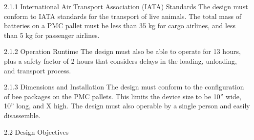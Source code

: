 2.1.1 International Air Transport Association (IATA) Standards
The design must conform to IATA standards for the transport of live animals. The total mass of batteries on a PMC pallet must be less than 35 kg for cargo airlines, and less than 5 kg for passenger airlines. 

2.1.2 Operation Runtime
The design must also be able to operate for 13 hours, plus a safety factor of 2 hours that considers delays in the loading, unloading, and transport process.

2.1.3 Dimensions and Installation
The design must conform to the configuration of bee packages on the PMC pallets. This limits the device size to be 10'' wide, 10'' long, and X high. The design must also operable by a single person and easily disassemble. 








2.2	Design Objectives

